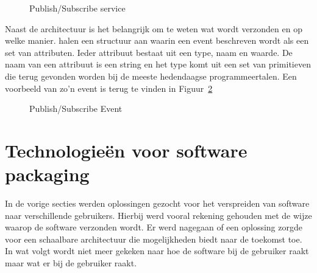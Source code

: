 \begin{figure}[!ht]
\centering
{}
\caption{Publish/Subscribe service \citep{carzaniga2001design}}
\label{fig:pubsubService}
\end{figure}

Naast de architectuur is het belangrijk om te weten wat wordt verzonden en op welke manier.
\citet{carzaniga2001design} halen een structuur aan waarin een event beschreven wordt als een set van attributen.
Ieder attribuut bestaat uit een type, naam en waarde.
De naam van een attribuut is een string en het type komt uit een set van primitieven die terug gevonden worden bij de meeste hedendaagse programmeertalen.
Een voorbeeld van zo'n event is terug te vinden in Figuur~\ref{fig:pubsubNot}

\begin{figure}[!ht]
\centering
{}
\caption{Publish/Subscribe Event \citep{carzaniga2001design}}
\label{fig:pubsubNot}
\end{figure}

\section{Technologieën voor software packaging}\label{sec:technologieen}
In de vorige secties werden oplossingen gezocht voor het verspreiden van software naar verschillende gebruikers.
Hierbij werd vooral rekening gehouden met de wijze waarop de software verzonden wordt.
Er werd nagegaan of een oplossing zorgde voor een schaalbare architectuur die mogelijkheden biedt naar de toekomst toe.
In wat volgt wordt niet meer gekeken naar hoe de software bij de gebruiker raakt maar wat er bij de gebruiker raakt.

